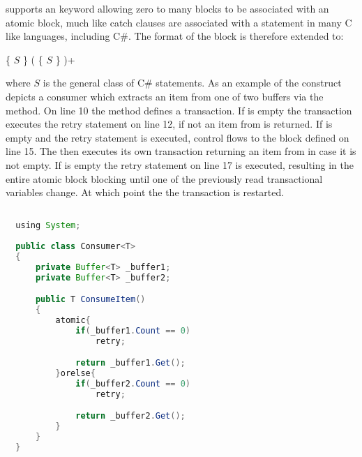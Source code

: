 \stmnamesp supports an  keyword allowing zero to many  blocks to be associated with an atomic block, much like catch clauses are associated with a  statement in many C like languages, including C\#\cite[p. 96]{sestoft2011c}. The  format of the  block is therefore extended to:

 \{ $S$ \} (  \{ $S$ \} )+

where $S$ is the general class of C\# statements. As an example of the  construct   depicts a consumer which extracts an item from one of two buffers via the  method. On line 10 the  method defines a transaction. If  is empty the transaction executes the retry statement on line 12, if not an item from  is returned. If  is empty and the retry statement is executed, control flows to the  block defined on line 15. The  then executes its own transaction returning an item from  in case it is not empty. If  is empty the retry statement on line 17 is executed, resulting in the entire atomic block blocking until one of the previously read transactional variables change. At which point the the transaction is restarted.

\begin{lstlisting}[label=lst:stm_atomic_syntax_orelse,
  caption={OrElse Syntax},
  language=Java,  
  showspaces=false,
  showtabs=false,
  breaklines=true,
  showstringspaces=false,
  breakatwhitespace=true,
  commentstyle=\color{greencomments},
  keywordstyle=\color{bluekeywords},
  stringstyle=\color{redstrings},
  morekeywords={atomic, retry, orelse, var, get, set, using}]  % Start your code-block

  using System;
  
  public class Consumer<T>
  {
      private Buffer<T> _buffer1;
      private Buffer<T> _buffer2;

      public T ConsumeItem()
      {
          atomic{
              if(_buffer1.Count == 0)
                  retry;

              return _buffer1.Get();
          }orelse{
              if(_buffer2.Count == 0)
                  retry;

              return _buffer2.Get();
          }
      }
  }
\end{lstlisting}

